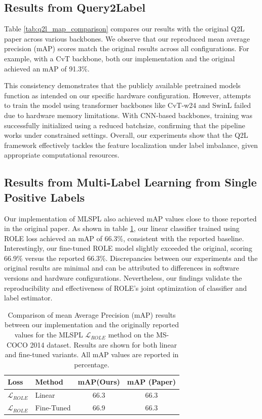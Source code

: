 \documentclass[lettersize,journal]{IEEEtran}
\begin{document}
\subsection{Results from Query2Label}
Table \ref{tab:q2l_map_comparison} compares our results with the original Q2L paper across various backbones. We observe that our reproduced mean average precision (mAP) scores match the original results across all configurations. For example, with a CvT backbone, both our implementation and the original achieved an mAP of 91.3\%.

This consistency demonstrates that the publicly available pretrained models function as intended on our specific hardware configuration. However, attempts to train the model using transformer backbones like CvT-w24 and SwinL failed due to hardware memory limitations. With CNN-based backbones, training was successfully initialized using a reduced batchsize, confirming that the pipeline works under constrained settings. Overall, our experiments show that the Q2L framework effectively tackles the feature localization under label imbalance, given appropriate computational resources.



\subsection{Results from Multi-Label Learning from Single Positive Labels}
Our implementation of MLSPL also achieved mAP values close to those reported in the original paper. As shown in table \ref{tab:MLSPL_map_comparison}, our linear classifier trained using ROLE loss achieved an mAP of 66.3\%, consistent with the reported baseline. Interestingly, our fine-tuned ROLE model slightly exceeded the original, scoring 66.9\% versus the reported 66.3\%. Discrepancies between our experiments and the original results are minimal and can be attributed to differences in software versions and hardware configurations. Nevertheless, our findings validate the reproducibility and effectiveness of ROLE's joint optimization of classifier and label estimator.

\begin{table}[H]
    \small
    \caption{Comparison of mean Average Precision (mAP) results between our implementation and the originally reported values for the MLSPL $\mathcal{L}_{ROLE}$ method on the MS-COCO 2014 dataset. Results are shown for both linear and fine-tuned variants. All mAP values are reported in percentage.}
    \label{tab:MLSPL_map_comparison}
    \centering
    \begin{tabular}{l l c c}
    \toprule
    \textbf{Loss} & \textbf{Method} & \textbf{mAP(Ours)} & \textbf{mAP (Paper)} \\
    \midrule
    $\mathcal{L}_{ROLE}$ & Linear & 66.3 & 66.3 \\
    $\mathcal{L}_{ROLE}$ & Fine-Tuned & 66.9 & 66.3 \\
    \bottomrule
    \end{tabular}
\end{table}
\end{document}

